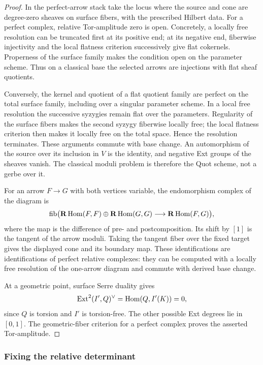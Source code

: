 \begin{proof}
In the perfect-arrow stack take the locus where the source and cone are
degree-zero sheaves on surface fibers, with the prescribed Hilbert data.
For a perfect complex, relative Tor-amplitude zero is open.
Concretely, a locally free resolution can be truncated first at its
positive end; at its negative end, fiberwise injectivity and the local
flatness criterion successively give flat cokernels.
Properness of the surface family makes the condition open on the
parameter scheme. Thus on a classical base the selected arrows are
injections with flat sheaf quotients.

Conversely, the kernel and quotient of a flat quotient family are perfect
on the total surface family, including over a singular parameter scheme.
In a local free resolution the successive syzygies remain flat over the
parameters. Regularity of the surface fibers makes the second syzygy
fiberwise locally free; the local flatness criterion then makes it
locally free on the total space. Hence the resolution terminates.
These arguments commute with base change. An automorphism of the source
over its inclusion in \(V\) is the identity, and negative Ext groups of
the sheaves vanish. The classical moduli problem is therefore the Quot
scheme, not a gerbe over it.

For an arrow \(F\to G\) with both vertices variable, the endomorphism
complex of the diagram is
\[
 \operatorname{fib}\bigl(
 \mathbf R\operatorname{Hom}(F,F)\oplus\mathbf R\operatorname{Hom}(G,G)
 \longrightarrow\mathbf R\operatorname{Hom}(F,G)\bigr),
\]
where the map is the difference of pre- and postcomposition.
Its shift by \([1]\) is the tangent of the arrow moduli.
Taking the tangent fiber over the fixed target gives the displayed
cone and its boundary map. These identifications are identifications of
perfect relative complexes: they can be computed with a locally free
resolution of the one-arrow diagram and commute with derived base
change.

At a geometric point, surface Serre duality gives
\[
 \operatorname{Ext}^2(I',Q)^\vee=\operatorname{Hom}(Q,I'(K))=0,
\]
since \(Q\) is torsion and \(I'\) is torsion-free.
The other possible Ext degrees lie in \([0,1]\).
The geometric-fiber criterion for a perfect complex proves the asserted
Tor-amplitude.
\end{proof}

\subsubsection{Fixing the relative determinant}

